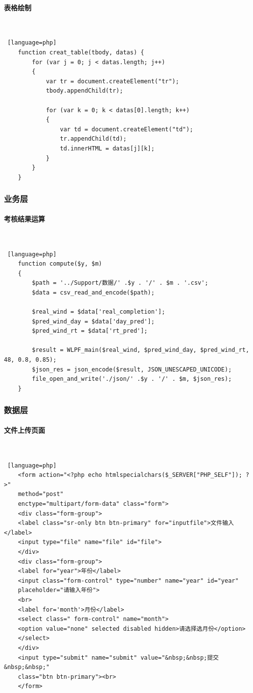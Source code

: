 \documentclass[winfonts,UTF8,a4paper]{ctexart}
\begin{document}
\paragraph*{表格绘制}\ \\
\begin{lstlisting} [language=php]
	function creat_table(tbody, datas) {
		for (var j = 0; j < datas.length; j++)  
		{
			var tr = document.createElement("tr");
			tbody.appendChild(tr);
			
			for (var k = 0; k < datas[0].length; k++)   
			{
				var td = document.createElement("td");  
				tr.appendChild(td);
				td.innerHTML = datas[j][k]; 
			}
		}
	}
\end{lstlisting}
\subsubsection*{业务层}
\paragraph*{考核结果运算}\ \\
\begin{lstlisting} [language=php]
	function compute($y, $m)
	{
		$path = '../Support/数据/' .$y . '/' . $m . '.csv';
		$data = csv_read_and_encode($path);
		
		$real_wind = $data['real_completion'];
		$pred_wind_day = $data['day_pred'];
		$pred_wind_rt = $data['rt_pred'];
		
		$result = WLPF_main($real_wind, $pred_wind_day, $pred_wind_rt, 48, 0.8, 0.85);
		$json_res = json_encode($result, JSON_UNESCAPED_UNICODE);
		file_open_and_write('./json/' .$y . '/' . $m, $json_res);
	}
\end{lstlisting}
\subsubsection*{数据层}
\paragraph*{文件上传页面}\ \\
\begin{lstlisting} [language=php]
	<form action="<?php echo htmlspecialchars($_SERVER["PHP_SELF"]); ?>"
	method="post"
	enctype="multipart/form-data" class="form">
	<div class="form-group">
	<label class="sr-only btn btn-primary" for="inputfile">文件输入</label>
	<input type="file" name="file" id="file">
	</div>
	<div class="form-group">
	<label for="year">年份</label>
	<input class="form-control" type="number" name="year" id="year"
	placeholder="请输入年份">
	<br>
	<label for='month'>月份</label>
	<select class=" form-control" name="month">
	<option value="none" selected disabled hidden>请选择选月份</option>
	</select>
	</div>
	<input type="submit" name="submit" value="&nbsp;&nbsp;提交&nbsp;&nbsp;"
	class="btn btn-primary"><br>
	</form>
\end{lstlisting}
\end{document}
